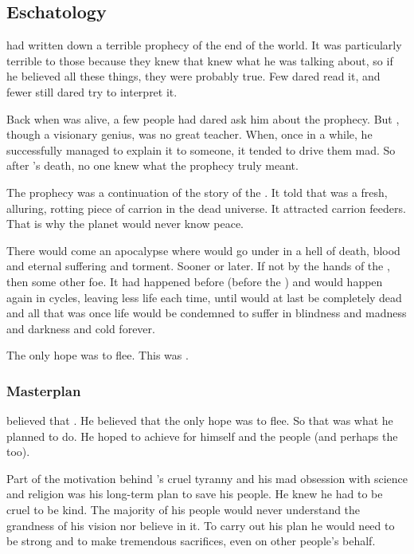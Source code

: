 \subsection{Eschatology}
\Sethicus had written down a terrible prophecy of the end of the world. 
It was particularly terrible to those  because they knew that \Sethicus knew what he was talking about, so if he believed all these things, they were probably true. 
Few dared read it, and fewer still dared try to interpret it.

Back when \Sethicus was alive, a few people had dared ask him about the prophecy. 
But \Sethicus, though a visionary genius, was no great teacher. 
When, once in a while, he successfully managed to explain it to someone, it tended to drive them mad. 
So after \Sethicus's death, no one knew what the prophecy truly meant. 

The prophecy was a continuation of the story of the . 
It told that \Miith was a fresh, alluring, rotting piece of carrion in the dead universe. 
It attracted carrion feeders. 
That is why the planet would never know peace. 

There would come an apocalypse where \Miith would go under in a hell of death, blood and eternal suffering and torment. 
Sooner or later. 
If not by the hands of the \banes, then some other foe. 
It had happened before (before the \ophidians) and would happen again in cycles, leaving less life each time, until \Miith would at last be completely dead and all that was once life would be condemned to suffer in blindness and madness and darkness and cold forever. 

The only hope was to flee. 
This was . 





\subsubsection{Masterplan}
\Sethicus believed that .
He believed that the only hope was to flee.
So that was what he planned to do. 
He hoped to achieve  for himself and the \draconian people (and perhaps the \ophidians too). 

Part of the motivation behind \Sethicus's cruel tyranny and his mad obsession with science and religion was his long-term plan to save his people. 
He knew he had to be cruel to be kind. 
The majority of his people would never understand the grandness of his vision nor believe in it. 
To carry out his plan he would need to be strong and to make tremendous sacrifices, even on other people's behalf. 

